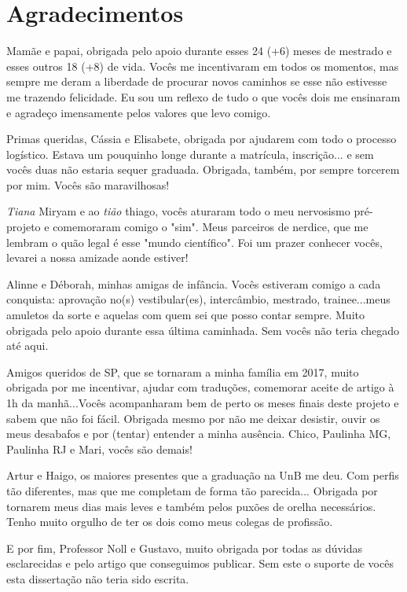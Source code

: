 \chapter*{Agradecimentos}

\par Mamãe e papai, obrigada pelo apoio durante esses 24 (+6) meses de mestrado e esses outros 18 (+8) de vida. Vocês me incentivaram em todos os momentos, mas sempre me deram a liberdade de procurar novos caminhos se esse não estivesse me trazendo felicidade. Eu sou um reflexo de tudo o que vocês dois me ensinaram e agradeço imensamente pelos valores que levo comigo. 
\par Primas queridas, Cássia e Elisabete, obrigada por ajudarem com todo o processo logístico. Estava um pouquinho longe durante a matrícula, inscrição... e sem vocês duas não estaria sequer graduada. Obrigada, também, por sempre torcerem por mim. Vocês são maravilhosas!
\par \textit{Tiana} Miryam e ao \textit{tião} thiago, vocês aturaram todo o meu nervosismo pré-projeto e comemoraram comigo o "sim". Meus parceiros de nerdice, que me lembram o quão legal é esse "mundo científico". Foi um prazer conhecer vocês, levarei a nossa amizade aonde estiver! 
\par Alinne e Déborah, minhas amigas de infância. Vocês estiveram comigo a cada conquista: aprovação no(s) vestibular(es), intercâmbio, mestrado, trainee...meus amuletos da sorte e aquelas com quem sei que posso contar sempre. Muito obrigada pelo apoio durante essa última caminhada. Sem vocês não teria chegado até aqui.
\par Amigos queridos de SP, que se tornaram a minha família em 2017, muito obrigada por me incentivar, ajudar com traduções, comemorar aceite de artigo  à 1h da manhã...Vocês acompanharam bem de perto os meses finais deste projeto e sabem que não foi fácil. Obrigada mesmo por não me deixar desistir, ouvir os meus desabafos e por (tentar) entender a minha ausência. Chico, Paulinha MG, Paulinha RJ e Mari, vocês são demais! 
\par Artur e Haigo, os maiores presentes que a graduação na UnB me deu. Com perfis tão diferentes, mas que me completam de forma tão parecida... Obrigada por tornarem meus dias mais leves e também pelos puxões de orelha necessários. Tenho muito orgulho de ter os dois como meus colegas de profissão. 
\par E por fim, Professor Noll e Gustavo, muito obrigada por todas as dúvidas esclarecidas e pelo artigo que conseguimos publicar. Sem este o suporte de vocês esta dissertação não teria sido escrita. 

